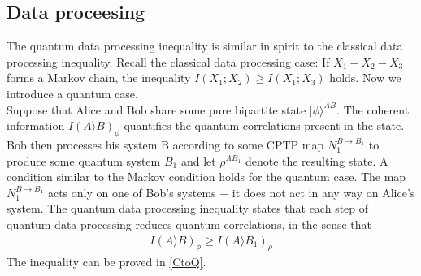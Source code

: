 \subsection{Data proceesing}
The quantum data processing inequality is similar in spirit to the classical data processing inequality. Recall the classical data processing case: If $X_1-X_2-X_3$ forms a Markov chain, the inequality $I(X_1;X_2) \geq I(X_1;X_3)$ holds. Now we introduce a quantum case. \\
Suppose that Alice and Bob share some pure bipartite state $|\phi \rangle ^{AB}$. The coherent information $I(A\rangle B)_{\phi}$ quantifies the quantum correlations present in the state. Bob then processes his system B according to some CPTP map $N_1^{B\to B_1}$ to produce some quantum system $B_1$ and let $\rho ^{AB_1}$ denote the resulting state. A condition similar to the Markov condition holds for the quantum case. The map $N_1^{B\to B_1}$ acts only on one of Bob's systems $-$ it does not act in any way on Alice's system. The quantum data processing inequality states that each step of quantum data processing reduces quantum correlations, in the sense that
\begin{align*}
I(A \rangle B)_{\phi} \geq I(A \rangle B_1)_{\rho}
\end{align*}
The inequality can be proved in \ref{CtoQ}.

